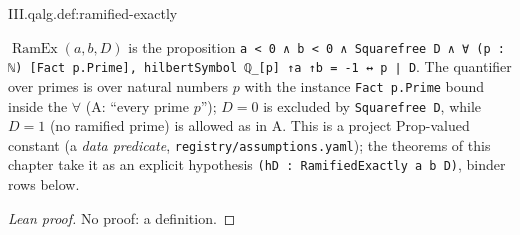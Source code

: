 \begin{definition}
\end{definition}
\begin{tfformal}{III.qalg.def:ramified-exactly}
\begin{tffidelity}
$\operatorname{RamEx}(a,b,D)$ is the proposition \texttt{a < 0 ∧ b < 0 ∧ Squarefree D ∧ ∀ (p : ℕ) [Fact p.Prime], hilbertSymbol ℚ\_[p] ↑a ↑b = -1 ↔ p ∣ D}. The quantifier over primes is over natural numbers $p$ with the instance \texttt{Fact p.Prime} bound inside the $\forall$ (A: ``every prime $p$''); $D=0$ is excluded by \texttt{Squarefree D}, while $D=1$ (no ramified prime) is allowed as in A. This is a project Prop-valued constant (a \emph{data predicate}, \texttt{registry/assumptions.yaml}); the theorems of this chapter take it as an explicit hypothesis \texttt{(hD : RamifiedExactly a b D)}, binder rows below.
\end{tffidelity}
\end{tfformal}
\begin{proof}[Lean proof]
No proof: a definition.
\end{proof}


